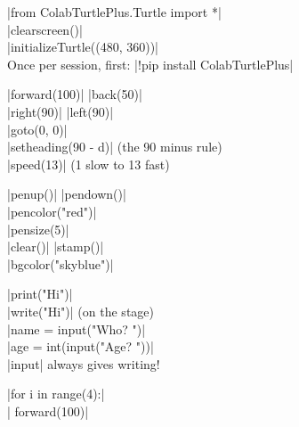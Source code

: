 \begin{tcbraster}[raster columns=2, raster column skip=10pt, raster row skip=8pt, raster equal height=rows,
  raster every box/.style={arc=6pt, coltitle=ink, fontupper=\small, left=6pt, right=4pt, top=3pt, bottom=3pt}]
\begin{tcolorbox}[raster multicolumn=2, colback=white, colframe=pen, colbacktitle=pen!40, title=\textbf{Start a drawing: the three starting lines}]
\py|from ColabTurtlePlus.Turtle import *|\\
\py|clearscreen()|\\
\py|initializeTurtle((480, 360))|\\[2pt]
{\color{muted}Once per session, first: \py|!pip install ColabTurtlePlus|}
\end{tcolorbox}
\begin{tcolorbox}[colback=white, colframe=motion, colbacktitle=motion!40, title=\textbf{Move}]
\py|forward(100)| \quad \py|back(50)|\\
\py|right(90)| \quad \py|left(90)|\\
\py|goto(0, 0)|\\
\py|setheading(90 - d)| {\color{muted}(the 90 minus rule)}\\
\py|speed(13)| {\color{muted}(1 slow to 13 fast)}
\end{tcolorbox}
\begin{tcolorbox}[colback=white, colframe=pen, colbacktitle=pen!40, title=\textbf{Pen}]
\py|penup()| \quad \py|pendown()|\\
\py|pencolor("red")|\\
\py|pensize(5)|\\
\py|clear()| \quad \py|stamp()|\\
\py|bgcolor("skyblue")|
\end{tcolorbox}
\begin{tcolorbox}[colback=white, colframe=looks, colbacktitle=looks!40, title=\textbf{Say and ask}]
\py|print("Hi")|\\
\py|write("Hi")| {\color{muted}(on the stage)}\\
\py|name = input("Who? ")|\\
\py|age = int(input("Age? "))|\\
{\color{muted}\py|input| always gives writing!}
\end{tcolorbox}
\begin{tcolorbox}[colback=white, colframe=control, colbacktitle=control!40, title=\textbf{Loops}]
\py|for i in range(4):|\\
\py|    forward(100)|\\[3pt]

\end{tcolorbox}
\end{tcbraster}
